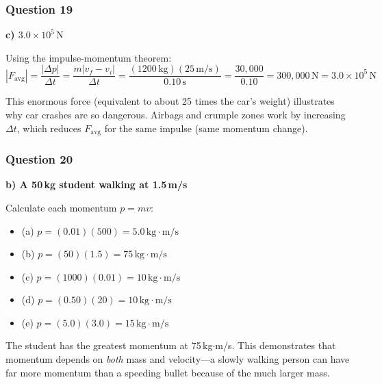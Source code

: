 \documentclass[12pt,letterpaper]{article}
\begin{document}
\subsubsection*{Question 19}

\begin{answerbox}
\textbf{c) $3.0 \times 10^5\,\text{N}$}
\end{answerbox}

\begin{explanationbox}
Using the impulse-momentum theorem:
\[
|F_{\text{avg}}| = \frac{|\Delta p|}{\Delta t} = \frac{m|v_f - v_i|}{\Delta t} = \frac{(1200\,\text{kg})(25\,\text{m/s})}{0.10\,\text{s}} = \frac{30{,}000}{0.10} = 300{,}000\,\text{N} = 3.0 \times 10^5\,\text{N}
\]

This enormous force (equivalent to about 25 times the car's weight) illustrates why car crashes are so dangerous. Airbags and crumple zones work by increasing $\Delta t$, which reduces $F_{\text{avg}}$ for the same impulse (same momentum change).
\end{explanationbox}

\subsubsection*{Question 20}

\begin{answerbox}
\textbf{b) A 50\,kg student walking at 1.5\,m/s}
\end{answerbox}

\begin{explanationbox}
Calculate each momentum $p = mv$:
\begin{itemize}
\item (a) $p = (0.01)(500) = 5.0\,\text{kg}\cdot\text{m/s}$
\item (b) $p = (50)(1.5) = 75\,\text{kg}\cdot\text{m/s}$
\item (c) $p = (1000)(0.01) = 10\,\text{kg}\cdot\text{m/s}$
\item (d) $p = (0.50)(20) = 10\,\text{kg}\cdot\text{m/s}$
\item (e) $p = (5.0)(3.0) = 15\,\text{kg}\cdot\text{m/s}$
\end{itemize}

The student has the greatest momentum at 75\,kg$\cdot$m/s. This demonstrates that momentum depends on \emph{both} mass and velocity---a slowly walking person can have far more momentum than a speeding bullet because of the much larger mass.
\end{explanationbox}
\end{document}
